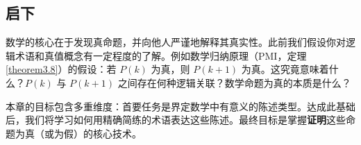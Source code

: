 \subsection{启下}

数学的核心在于发现真命题，并向他人严谨地解释其真实性。此前我们假设你对逻辑术语和真值概念有一定程度的了解。例如数学归纳原理（PMI，定理 \ref{theorem3.8}）的假设：若 $P(k)$ 为真，则 $P(k+1)$ 为真。这究竟意味着什么？$P(k)$ 与 $P(k + 1)$ 之间存在何种逻辑关联？数学命题为真的本质是什么？

本章的目标包含多重维度：首要任务是界定数学中有意义的陈述类型。达成此基础后，我们将学习如何用精确简练的术语表达这些陈述。最终目标是掌握\textbf{证明}这些命题为真（或为假）的核心技术。

